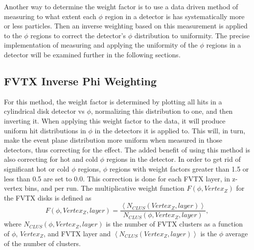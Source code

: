 Another way to determine the weight factor is to use a data driven method of measuring to what extent each $\phi$ region in a detector is has systematically more or less particles. Then an inverse weighting based on this measurement is applied to the $\phi$ regions to correct the detector's $\phi$ distribution to uniformity. The precise implementation of measuring and applying the uniformity of the $\phi$ regions in a detector will be examined further in the following sections.

\subsection{FVTX Inverse Phi Weighting}
For this method, the weight factor is determined by plotting all hits in a cylindrical disk detector vs $\phi$, normalizing this distribution to one, and then inverting it. When applying this weight factor to the data, it will produce uniform hit distributions in $\phi$ in the detectors it is applied to. This will, in turn, make the event plane distribution more uniform when measured in those detectors, thus correcting for the effect. The added benefit of using this method is also correcting for hot and cold $\phi$ regions in the detector. In order to get rid of significant hot or cold $\phi$ regions, $\phi$ regions with weight factors greater than 1.5 or less than 0.5 are set to 0.0. This correction is done for each FVTX layer, in z-vertex bins, and per run. The multiplicative weight function $F(\phi,Vertex_Z)$ for the FVTX disks is defined as 
\begin{equation}
F(\phi,Vertex_Z,layer) = \frac{\left<N_{CLUS}(Vertex_Z,layer)\right>}{N_{CLUS}(\phi,Vertex_Z,layer)},
\end{equation}
where $N_{CLUS}(\phi,Vertex_Z,layer)$ is the number of FVTX clusters as a function of $\phi$, $Vertex_Z$, and FVTX layer and $\left<N_{CLUS}(Vertex_Z,layer)\right>$ is the $\phi$ average of the number of clusters.

